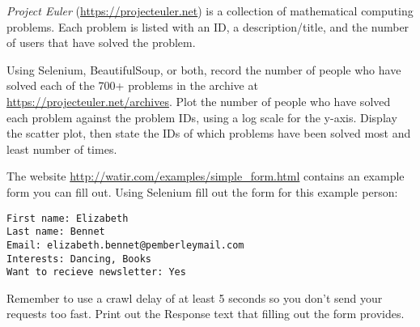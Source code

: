 \begin{problem} %
\emph{Project Euler} (\url{https://projecteuler.net}) is a collection of mathematical computing problems.
Each problem is listed with an ID, a description/title, and the number of users that have solved the problem.

Using Selenium, BeautifulSoup, or both, record the number of people who have solved each of the 700+ problems in the archive at \url{https://projecteuler.net/archives}.
Plot the number of people who have solved each problem against the problem IDs, using a log scale for the y-axis.
Display the scatter plot, then state the IDs of which problems have been solved most and least number of times.
\end{problem}



\begin{problem} %
The website \url{http://watir.com/examples/simple_form.html} contains an example form you can fill out.
Using Selenium fill out the form for this example person:
\begin{lstlisting}
First name: Elizabeth
Last name: Bennet
Email: elizabeth.bennet@pemberleymail.com
Interests: Dancing, Books
Want to recieve newsletter: Yes
\end{lstlisting}
Remember to use a crawl delay of at least 5 seconds so you don't send your requests too fast.
Print out the Response text that filling out the form provides.
\end{problem}


